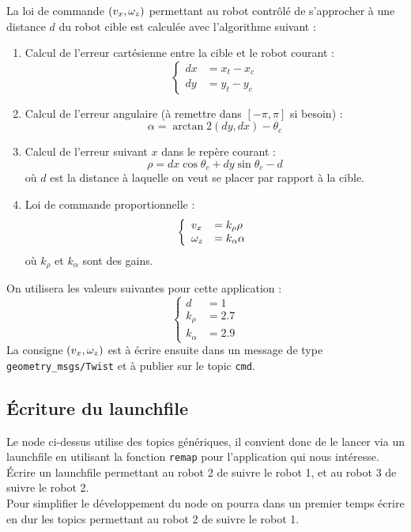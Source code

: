 \documentclass{ecnreport}
\begin{document}
La loi de commande $(v_x,\omega_z)$ permettant au robot contrôlé de s'approcher à une distance $d$ du robot cible est calculée avec l'algorithme suivant :
\begin{enumerate}
 \item Calcul de l'erreur cartésienne entre la cible et le robot courant :
 \begin{equation*}
  \left\{\begin{array}{ll}
          dx &= x_t - x_c \\
          dy &= y_t - y_c
         \end{array}\right.
 \end{equation*}
 \item Calcul de l'erreur angulaire (à remettre dans $[-\pi,\pi]$ si besoin) :
  \begin{equation*}
  \alpha = \arctan2(dy, dx) - \theta_c
 \end{equation*}
 \item Calcul de l'erreur suivant $x$ dans le repère courant :
   \begin{equation*}
  \rho= dx\cos\theta_c + dy\sin\theta_c - d
 \end{equation*}où $d$ est la distance à laquelle on veut se placer par rapport à la cible.
 \item Loi de commande proportionnelle :
  \begin{equation*}
  \left\{\begin{array}{ll}
          v_x &= k_\rho\rho \\
          \omega_z &= k_\alpha \alpha
         \end{array}\right.
 \end{equation*}où $k_\rho$ et $k_\alpha$ sont des gains.
\end{enumerate}
On utilisera les valeurs suivantes pour cette application :
 \begin{equation*}
  \left\{\begin{array}{ll}
          d &= 1 \\
          k_\rho &= 2.7 \\
          k_\alpha &= 2.9
         \end{array}\right.
 \end{equation*}
La consigne $(v_x,\omega_z)$ est à écrire ensuite dans un message de type \texttt{geometry\_msgs/Twist} et à publier sur le topic \texttt{cmd}.
\newpage

\subsection{Écriture du launchfile}

Le node ci-dessus utilise des topics génériques, il convient donc de le lancer via un launchfile en utilisant la fonction \texttt{remap} pour l'application qui nous intéresse.\\

Écrire un launchfile permettant au robot 2 de suivre le robot 1, et au robot 3 de suivre le robot 2.\\

Pour simplifier le développement du node on pourra dans un premier temps écrire en dur les topics permettant au robot 2 de suivre le robot 1.
\end{document}
